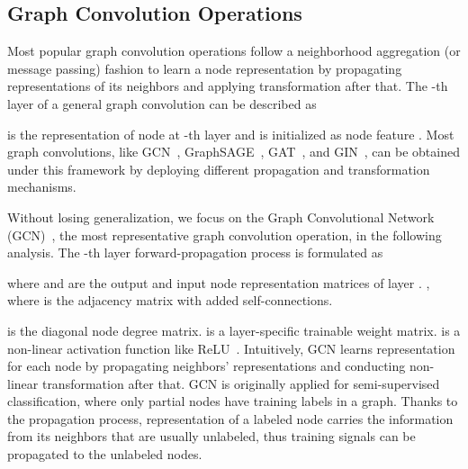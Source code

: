 \documentclass[sigconf]{acmart}
\begin{document}
\subsection{Graph Convolution Operations}

Most popular graph convolution operations follow a neighborhood
aggregation (or message passing) fashion to learn a node
representation by propagating representations of its neighbors
and applying transformation after that. The -th layer of
a general graph convolution can be described as

 is the representation of node  at
-th layer and  is initialized as node
feature . Most graph convolutions, like
GCN~\cite{kipf2016semi}, GraphSAGE~\cite{hamilton2017inductive}, GAT~\cite{velivckovic2017graph}, and GIN~\cite{xu2018powerful}, can be obtained under this
framework by deploying different propagation and transformation
mechanisms.

Without losing generalization, we focus on the Graph
Convolutional Network (GCN)~\cite{kipf2016semi}, the most
representative graph convolution operation, in the following
analysis. The -th layer forward-propagation process is
formulated as

where  and  are the output and input node
representation matrices of layer .
,
where 
is the adjacency matrix with added self-connections.

is the diagonal node degree matrix.  is a layer-specific
trainable weight matrix.  is a non-linear activation
function like ReLU~\cite{nair2010rectified}. Intuitively, GCN
learns representation for each node by propagating neighbors'
representations and conducting non-linear transformation after
that. GCN is originally applied for semi-supervised
classification, where only partial nodes have training labels in
a graph. Thanks to the propagation process, representation of a
labeled node carries the information from its neighbors that are
usually unlabeled, thus training signals can be propagated to the
unlabeled nodes.
\end{document}
